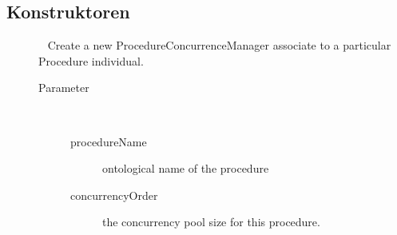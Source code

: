 \subsection{Konstruktoren}
\begin{description}
\item[{\label{ontologyFramework.OFProcedureManagment.ProcedureConcurrenceManager(java.lang.String,java.lang.Integer)}}]
~ Create a new ProcedureConcurrenceManager associate to a particular 
 Procedure individual.
\begin{description}
\item[Parameter] ~
\begin{description}
\item[procedureName]
ontological name of the procedure
\item[concurrencyOrder]
the concurrency pool size for this procedure.
\end{description}
\end{description}
\end{description}
